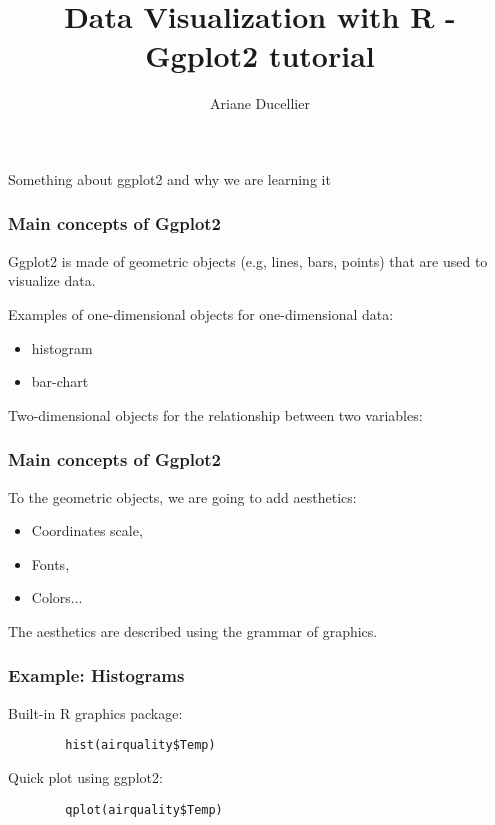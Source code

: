 \documentclass{beamer}
\title[Ggplot2 tutorial]{Data Visualization with R - Ggplot2 tutorial}
\author{Ariane Ducellier}
\begin{document}
	\begin{frame}
		\titlepage
	\end{frame}

	\begin{frame}
		Something about ggplot2 and why we are learning it
	\end{frame}

	\begin{frame}
		\frametitle{Main concepts of Ggplot2}

		Ggplot2 is made of geometric objects (e.g, lines, bars, points) that are used to visualize data.

		Examples of one-dimensional objects for one-dimensional data:
		\begin{itemize}
			\item histogram
			\item bar-chart
		\end{itemize}

		Two-dimensional objects for the relationship between two variables:

	\end{frame}

	\begin{frame}
		\frametitle{Main concepts of Ggplot2}
		
		To the geometric objects, we are going to add aesthetics:
		\begin{itemize}
			\item Coordinates scale,
			\item Fonts,
			\item Colors...
		\end{itemize}

		The aesthetics are described using the grammar of graphics.

	\end{frame}

	\begin{frame}[fragile]
		\frametitle{Example: Histograms}

		Built-in R graphics package:

		\begin{exampleblock}{}
		\begin{center}
		\begin{BVerbatim}
		hist(airquality$Temp)
		\end{BVerbatim}
		\end{center}
		\end{exampleblock}{}

		Quick plot using ggplot2:

		\begin{exampleblock}{}
		\begin{center}
		\begin{BVerbatim}
		qplot(airquality$Temp)
		\end{BVerbatim}
		\end{center}
		\end{exampleblock}{}

	\end{frame}
\end{document}
